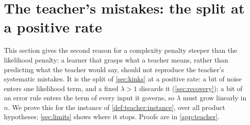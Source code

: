 \section{The teacher's mistakes: the split at a positive rate}\label{sec:teacher}

This section gives the second reason for a complexity penalty steeper than the likelihood penalty: a learner that grasps what a teacher means, rather than predicting what the teacher would say, should not reproduce the teacher's systematic mistakes. It is the split of \cref{sec:kinks} at a positive rate: a bit of noise enters one likelihood term, and a fixed $\lambda>1$ discards it (\cref{sec:recovery}); a bit of an error rule enters the term of every input it governs, so $\lambda$ must grow linearly in $n$. We prove this for the instance of \cref{def:teacher:instance}, over all product hypotheses; \cref{sec:limits} shows where it stops. Proofs are in \cref{app:teacher}.

